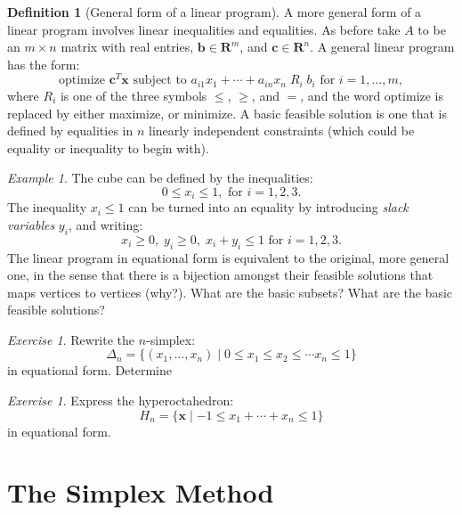 \documentclass{amsbook}
\newcommand{\xx}{\mathbf x}
\newcommand{\cc}{\mathbf c}
\newcommand{\bb}{\mathbf b}
\newcommand{\RR}{\mathbf R}
\theoremstyle{definition}
\newtheorem{definition}[theorem]{Definition}
\theoremstyle{remark}
\newtheorem{example}[theorem]{Example}
\newtheorem{exercise}[theorem]{Exercise}
\begin{document}
\begin{definition}
  [General form of a linear program]
  A more general form of a linear program involves linear inequalities and equalities.
  As before take $A$ to be an $m\times n$ matrix with real entries, $\bb\in \RR^m$, and $\cc\in \RR^n$.
  A general linear program has the form:
  \begin{equation}
    \label{eq:general-lp}
    \tag{GLP}
    \text{optimize $\cc^T\xx$ subject to }a_{i1}x_1+\dotsb + a_{in}x_n\; R_i\; b_i \text{ for }i=1,\dotsc,m,
  \end{equation}
  where $R_i$ is one of the three symbols $\leq$, $\geq$, and $=$, and the word optimize is replaced by either maximize, or minimize.
  A basic feasible solution is one that is defined by equalities in $n$ linearly independent constraints (which could be equality or inequality to begin with).
\end{definition}
\begin{example}
  The cube can be defined by the inequalities:
  \begin{displaymath}
    0\leq x_i \leq 1, \text{ for } i=1,2,3.
  \end{displaymath}
  The inequality $x_i\leq 1$ can be turned into an equality by introducing \emph{slack variables} $y_i$, and writing:
  \begin{displaymath}
    x_i\geq 0,\;y_i\geq 0,\;x_i+y_i\leq 1 \text{ for }i=1,2,3.
  \end{displaymath}
  The linear program in equational form is equivalent to the original, more general one, in the sense that there is a bijection amongst their feasible solutions that maps vertices to vertices (why?).
  What are the basic subsets? What are the basic feasible solutions?
\end{example}
\begin{exercise}
  Rewrite the $n$-simplex:
  \begin{displaymath}
    \Delta_n = \{(x_1,\dotsc,x_n)\mid 0\leq x_1\leq x_2 \leq \dotsb x_n\leq 1\}
  \end{displaymath}
  in equational form.
  Determine 
\end{exercise}
\begin{exercise}
  Express the hyperoctahedron:
  \begin{displaymath}
    H_n = \{\xx\mid -1\leq x_1+\dotsb+x_n\leq 1\}
  \end{displaymath}
  in equational form.
\end{exercise}

\section{The Simplex Method}
\label{sec:simplex-method}
\end{document}
